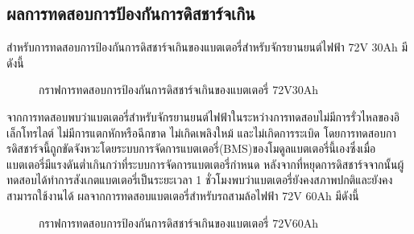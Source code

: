 \subsection{ผลการทดสอบการป้องกันการดิสชาร์จเกิน}
สำหรับการทดสอบการป้องกันการดิสชาร์จเกินของแบตเตอรี่สำหรับจักรยานยนต์ไฟฟ้า 72V 30Ah มีดังนี้
\begin{center}
	\begin{figure}[H]
		\centering
		\captionsetup{justification=centering,margin=2cm}
		\caption{กราฟการทดสอบการป้องกันการดิสชาร์จเกินของแบตเตอรี่ 72V30Ah}
	\end{figure}
\end{center}
จากการทดสอบพบว่าแบตเตอรี่สำหรับจักรยานยนต์ไฟฟ้าในระหว่างการทดสอบไม่มีการรั่วไหลของอิเล็กโทรไลต์ ไม่มีการแตกหักหรือฉีกขาด ไม่เกิดเพลิงใหม้ และไม่เกิดการระเบิด
โดยการทดสอบการดิสชาร์จนี้ถูกขัดจังหวะโดยระบบการจัดการแบตเตอรี่(BMS)ของโมดูลแบตเตอรี่นี้เองซึ่งเมื่อแบตเตอรี่มีแรงดันต่ำเกินกว่าที่ระบบการจัดการแบตเตอรี่กำหนด
หลังจากที่หยุดการดิสชาร์จจากนั้นผู้ทดสอบได้ทำการสังเกตแบตเตอรี่เป็นระยะเวลา 1 ชั่วโมงพบว่าแบตเตอรี่ยังคงสภาพปกติและยังคงสามารถใช้งานได้
\newline
ผลจากการทดสอบแบตเตอรี่สำหรับรถสามล้อไฟฟ้า 72V 60Ah มีดังนี้
\begin{center}
	\begin{figure}[H]
		\centering
		\captionsetup{justification=centering,margin=2cm}
		\caption{กราฟการทดสอบการป้องกันการดิสชาร์จเกินของแบตเตอรี่ 72V60Ah}
	\end{figure}
\end{center}
